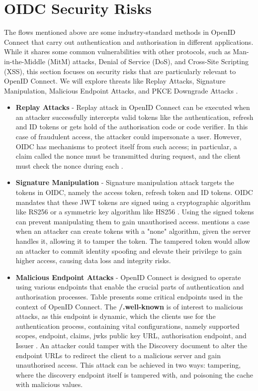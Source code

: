 \section{OIDC Security Risks}

The flows mentioned above are some industry-standard methods in OpenID Connect that carry out authentication and authorisation in different applications. While it shares some common vulnerabilities with other protocols, such as Man-in-the-Middle (MitM) attacks, Denial of Service (DoS), and Cross-Site Scripting (XSS), this section focuses on security risks that are particularly relevant to OpenID Connect. We will explore threats like Replay Attacks, Signature Manipulation, Malicious Endpoint Attacks, and PKCE Downgrade Attacks \citep{oidc_attacks}. 

\begin{itemize}
    \item \textbf{Replay Attacks} - Replay attack in OpenID Connect can be executed when an attacker successfully intercepts valid tokens like the authentication, refresh and ID tokens or gets hold of the authorisation code or code verifier. In this case of fraudulent access, the attacker could impersonate a user. However, OIDC has mechanisms to protect itself from such access; in particular, a claim called the nonce must be transmitted during request, and the client must check the nonce during each \citep{oidc_attacks}.
    
    \item \textbf{Signature Manipulation} - Signature manipulation attack targets the tokens in OIDC, namely the access token, refresh token and ID tokens. OIDC mandates that these JWT tokens are signed using a cryptographic algorithm like RS256 or a symmetric key algorithm like HS256 \citep{signed_token}. Using the signed tokens can prevent manipulating them to gain unauthorised access. \cite{oidc_attacks} mentions a case when an attacker can create tokens with a "none" algorithm, given the server handles it, allowing it to tamper the token. The tampered token would allow an attacker to commit identity spoofing and elevate their privilege to gain higher access, causing data loss and integrity risks.
    
    \item \textbf{Malicious Endpoint Attacks} - OpenID Connect is designed to operate using various endpoints that enable the crucial parts of authentication and authorisation processes. Table \citep{auth0_api_endpoints} presents some critical endpoints used in the context of OpenID Connect. The \textbf{/.well-known} is of interest to malicious attacks, as this endpoint is dynamic, which the clients use for the authentication process, containing vital configurations, namely supported scopes, endpoint, claims, jwks public key URL, authorisation endpoint, and Issuer \citep{oidc_attacks}. An attacker could tamper with the Discovery document to alter the endpoint URLs to redirect the client to a malicious server and gain unauthorised access. This attack can be achieved in two ways: tampering, where the discovery endpoint itself is tampered with, and poisoning the cache with malicious values. 


\end{itemize}
